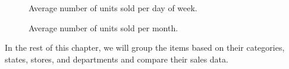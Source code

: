 \begin{figure}[H]
    \begin{minipage}{0.48\textwidth}
        \centering
        \vspace{3mm}
        \captionsetup{width=.98\textwidth}
        \caption{Average number of units sold per day of week.}
        \label{fig:dow_sales}
    \end{minipage}
    \hfill
    \begin{minipage}{0.48\textwidth}
        \centering
        \captionsetup{width=.98\textwidth}
        \caption{Average number of units sold per month.}
        \label{fig:moy_sales}
    \end{minipage}
\end{figure}

In the rest of this chapter, we will group the items based on their categories, states, stores, and departments and compare their sales data.

